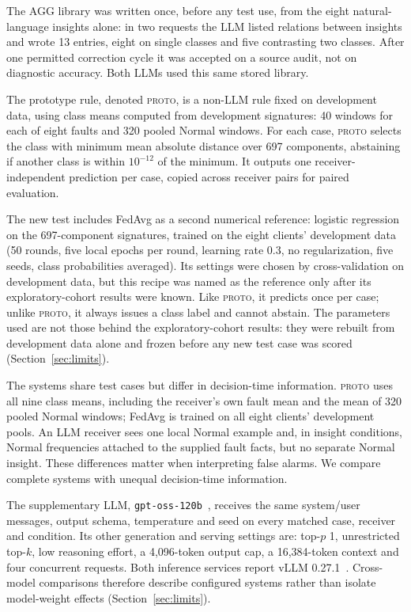 \documentclass[conference]{IEEEtran}
\newcommand{\PROTO}{\textsc{proto}}
\newcommand{\cond}[1]{\textsf{#1}}
\begin{document}
The \cond{AGG} library was written once, before any test use, from the eight natural-language insights alone: in two requests the LLM listed relations between insights and wrote 13 entries, eight on single classes and five contrasting two classes. After one permitted correction cycle it was accepted on a source audit, not on diagnostic accuracy. Both LLMs used this same stored library.

The prototype rule, denoted \PROTO{}, is a non-LLM rule fixed on development data, using class means computed from development signatures: 40 windows for each of eight faults and 320 pooled Normal windows. For each case, \PROTO{} selects the class with minimum mean absolute distance over 697 components, abstaining if another class is within $10^{-12}$ of the minimum. It outputs one receiver-independent prediction per case, copied across receiver pairs for paired evaluation.

The new test includes FedAvg as a second numerical reference: logistic regression on the 697-component signatures, trained on the eight clients' development data (50 rounds, five local epochs per round, learning rate 0.3, no regularization, five seeds, class probabilities averaged). Its settings were chosen by cross-validation on development data, but this recipe was named as the reference only after its exploratory-cohort results were known. Like \PROTO{}, it predicts once per case; unlike \PROTO{}, it always issues a class label and cannot abstain. The parameters used are not those behind the exploratory-cohort results: they were rebuilt from development data alone and frozen before any new test case was scored (Section~\ref{sec:limits}).

The systems share test cases but differ in decision-time information. \PROTO{} uses all nine class means, including the receiver's own fault mean and the mean of 320 pooled Normal windows; FedAvg is trained on all eight clients' development pools. An LLM receiver sees one local Normal example and, in insight conditions, Normal frequencies attached to the supplied fault facts, but no separate Normal insight. These differences matter when interpreting false alarms. We compare complete systems with unequal decision-time information.

The supplementary LLM, \texttt{gpt-oss-120b}~\cite{gptoss2025model}, receives the same system/user messages, output schema, temperature and seed on every matched case, receiver and condition. Its other generation and serving settings are: top-$p$ 1, unrestricted top-$k$, low reasoning effort, a 4,096-token output cap, a 16,384-token context and four concurrent requests. Both inference services report vLLM 0.27.1~\cite{kwon2023vllm}. Cross-model comparisons therefore describe configured systems rather than isolate model-weight effects (Section~\ref{sec:limits}).
\end{document}
